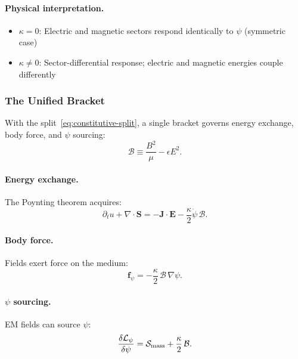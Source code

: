 \paragraph{Physical interpretation.}
\begin{itemize}
\item $\kappa = 0$: Electric and magnetic sectors respond identically to $\psi$ (symmetric case)
\item $\kappa \neq 0$: Sector-differential response; electric and magnetic energies couple differently
\end{itemize}

\subsubsection{The Unified Bracket}

With the split~\eqref{eq:constitutive-split}, a single bracket governs energy exchange, body force, and $\psi$ sourcing:
\begin{equation}\label{eq:unified-bracket}
\mathcal{B} \equiv \frac{B^2}{\mu} - \epsilon E^2.
\end{equation}

\paragraph{Energy exchange.}
The Poynting theorem acquires:
\begin{equation}
\partial_t u + \nabla\cdot\mathbf{S} = -\mathbf{J}\cdot\mathbf{E} - \frac{\kappa}{2}\dot{\psi}\,\mathcal{B}.
\end{equation}

\paragraph{Body force.}
Fields exert force on the medium:
\begin{equation}
\mathbf{f}_\psi = -\frac{\kappa}{2}\,\mathcal{B}\,\nabla\psi.
\end{equation}

\paragraph{$\psi$ sourcing.}
EM fields can source $\psi$:
\begin{equation}
\frac{\delta\mathcal{L}_\psi}{\delta\psi} = \mathcal{S}_{\rm mass} + \frac{\kappa}{2}\,\mathcal{B}.
\end{equation}

